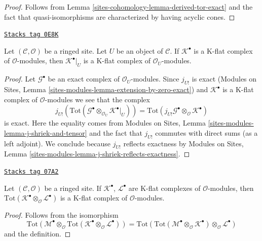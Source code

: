 \begin{proof}
Follows from
Lemma \ref{sites-cohomology-lemma-derived-tor-exact}
and the fact that quasi-isomorphisms are characterized by having
acyclic cones.
\end{proof}

\begin{lemma}
\label{sites-cohomology-lemma-restriction-K-flat}
\href{https://stacks.math.columbia.edu/tag/0E8K}{\texttt{Stacks tag 0E8K}}

Let $(\mathcal{C}, \mathcal{O})$ be a ringed site.
Let $U$ be an object of $\mathcal{C}$.
If $\mathcal{K}^\bullet$ is a K-flat complex of $\mathcal{O}$-modules, then
$\mathcal{K}^\bullet|_U$ is a K-flat complex of $\mathcal{O}_U$-modules.
\end{lemma}

\begin{proof}
Let $\mathcal{G}^\bullet$ be an exact complex of $\mathcal{O}_U$-modules.
Since $j_{U!}$ is exact
(Modules on Sites, Lemma \ref{sites-modules-lemma-extension-by-zero-exact})
and $\mathcal{K}^\bullet$ is a K-flat complex of $\mathcal{O}$-modules
we see that the complex
$$
j_{U!}(\text{Tot}(\mathcal{G}^\bullet \otimes_{\mathcal{O}_U}
\mathcal{K}^\bullet|_U)) =
\text{Tot}(j_{U!}\mathcal{G}^\bullet \otimes_\mathcal{O} \mathcal{K}^\bullet)
$$
is exact. Here the equality comes from
Modules on Sites, Lemma \ref{sites-modules-lemma-j-shriek-and-tensor}
and the fact that $j_{U!}$ commutes with direct sums (as a left adjoint).
We conclude because $j_{U!}$ reflects exactness by
Modules on Sites, Lemma \ref{sites-modules-lemma-j-shriek-reflects-exactness}.
\end{proof}

\begin{lemma}
\label{sites-cohomology-lemma-tensor-product-K-flat}
\href{https://stacks.math.columbia.edu/tag/07A2}{\texttt{Stacks tag 07A2}}

Let $(\mathcal{C}, \mathcal{O})$ be a ringed site.
If $\mathcal{K}^\bullet$, $\mathcal{L}^\bullet$ are K-flat complexes
of $\mathcal{O}$-modules, then
$\text{Tot}(\mathcal{K}^\bullet \otimes_\mathcal{O} \mathcal{L}^\bullet)$
is a K-flat complex of $\mathcal{O}$-modules.
\end{lemma}

\begin{proof}
Follows from the isomorphism
$$
\text{Tot}(\mathcal{M}^\bullet \otimes_\mathcal{O}
\text{Tot}(\mathcal{K}^\bullet \otimes_\mathcal{O} \mathcal{L}^\bullet))
=
\text{Tot}(\text{Tot}(\mathcal{M}^\bullet \otimes_\mathcal{O}
\mathcal{K}^\bullet) \otimes_\mathcal{O} \mathcal{L}^\bullet)
$$
and the definition.
\end{proof}


